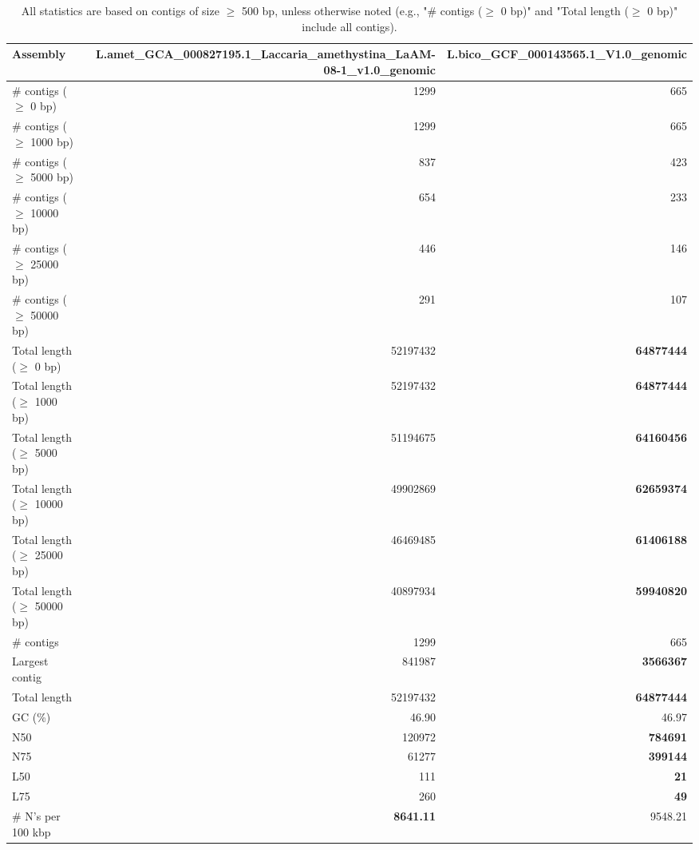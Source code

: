 \documentclass[12pt,a4paper]{article}
\begin{document}
\begin{table}[ht]
\begin{center}
\caption{All statistics are based on contigs of size $\geq$ 500 bp, unless otherwise noted (e.g., "\# contigs ($\geq$ 0 bp)" and "Total length ($\geq$ 0 bp)" include all contigs).}
\begin{tabular}{|l*{2}{|r}|}
\hline
Assembly & L.amet\_GCA\_000827195.1\_Laccaria\_amethystina\_LaAM-08-1\_v1.0\_genomic & L.bico\_GCF\_000143565.1\_V1.0\_genomic \\ \hline
\# contigs ($\geq$ 0 bp) & 1299 & 665 \\ \hline
\# contigs ($\geq$ 1000 bp) & 1299 & 665 \\ \hline
\# contigs ($\geq$ 5000 bp) & 837 & 423 \\ \hline
\# contigs ($\geq$ 10000 bp) & 654 & 233 \\ \hline
\# contigs ($\geq$ 25000 bp) & 446 & 146 \\ \hline
\# contigs ($\geq$ 50000 bp) & 291 & 107 \\ \hline
Total length ($\geq$ 0 bp) & 52197432 & {\bf 64877444} \\ \hline
Total length ($\geq$ 1000 bp) & 52197432 & {\bf 64877444} \\ \hline
Total length ($\geq$ 5000 bp) & 51194675 & {\bf 64160456} \\ \hline
Total length ($\geq$ 10000 bp) & 49902869 & {\bf 62659374} \\ \hline
Total length ($\geq$ 25000 bp) & 46469485 & {\bf 61406188} \\ \hline
Total length ($\geq$ 50000 bp) & 40897934 & {\bf 59940820} \\ \hline
\# contigs & 1299 & 665 \\ \hline
Largest contig & 841987 & {\bf 3566367} \\ \hline
Total length & 52197432 & {\bf 64877444} \\ \hline
GC (\%) & 46.90 & 46.97 \\ \hline
N50 & 120972 & {\bf 784691} \\ \hline
N75 & 61277 & {\bf 399144} \\ \hline
L50 & 111 & {\bf 21} \\ \hline
L75 & 260 & {\bf 49} \\ \hline
\# N's per 100 kbp & {\bf 8641.11} & 9548.21 \\ \hline
\end{tabular}
\end{center}
\end{table}
\end{document}
